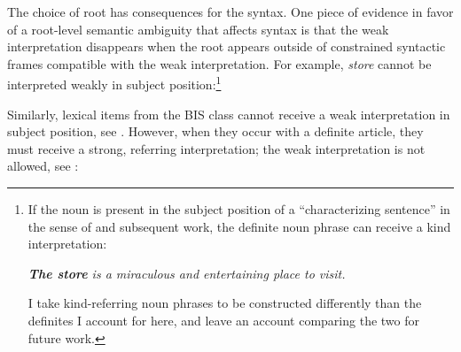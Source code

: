 \documentclass[output=paper,
modfonts
]{langscibook}
\begin{document}
The choice of root has consequences for the syntax. One piece of evidence in favor of a root-level semantic ambiguity that affects syntax is that the weak interpretation disappears when the root appears outside of constrained syntactic frames compatible with the weak interpretation. For example, \textit{store} cannot be interpreted weakly in subject position:\footnote{If the noun is present in the subject position of a ``characterizing sentence'' in the sense of \citet{Carlson1977} and subsequent work, the definite noun phrase can receive a kind interpretation: 
\begin{exe} 
\textit{\textbf{The store} is a miraculous and entertaining place to visit.}
\end{exe} 
I take kind-referring noun phrases to be constructed differently than the definites I account for here, and leave an account comparing the two for future work.}

\begin{exe}
\end{exe}

Similarly, lexical items from the BIS class cannot receive a weak interpretation in subject position, see . However, when they occur with a definite article, they must receive a strong, referring interpretation; the weak interpretation is not allowed, see :

\begin{exe}
\end{exe}
\end{document}
